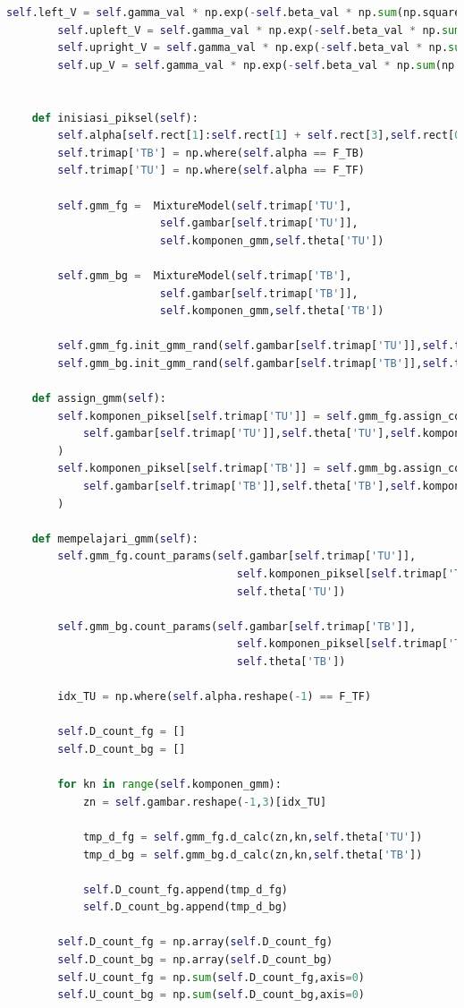 \begin{lstlisting}[language=Python,basicstyle=\tiny]
		self.left_V = self.gamma_val * np.exp(-self.beta_val * np.sum(np.square(left_diff_V),axis=2))
		self.upleft_V = self.gamma_val * np.exp(-self.beta_val * np.sum(np.square(upleft_diff_V),axis=2))
		self.upright_V = self.gamma_val * np.exp(-self.beta_val * np.sum(np.square(upright_diff_V),axis=2))
		self.up_V = self.gamma_val * np.exp(-self.beta_val * np.sum(np.square(up_diff_V),axis=2))


	def inisiasi_piksel(self):
		self.alpha[self.rect[1]:self.rect[1] + self.rect[3],self.rect[0]:self.rect[0] + self.rect[2]] = F_TF
		self.trimap['TB'] = np.where(self.alpha == F_TB)
		self.trimap['TU'] = np.where(self.alpha == F_TF)

		self.gmm_fg =  MixtureModel(self.trimap['TU'],
						self.gambar[self.trimap['TU']],
						self.komponen_gmm,self.theta['TU'])

		self.gmm_bg =  MixtureModel(self.trimap['TB'],
						self.gambar[self.trimap['TB']],
						self.komponen_gmm,self.theta['TB'])

		self.gmm_fg.init_gmm_rand(self.gambar[self.trimap['TU']],self.theta['TU'])
		self.gmm_bg.init_gmm_rand(self.gambar[self.trimap['TB']],self.theta['TB'])

	def assign_gmm(self):
		self.komponen_piksel[self.trimap['TU']] = self.gmm_fg.assign_component(
			self.gambar[self.trimap['TU']],self.theta['TU'],self.komponen_gmm
		)
		self.komponen_piksel[self.trimap['TB']] = self.gmm_bg.assign_component(
			self.gambar[self.trimap['TB']],self.theta['TB'],self.komponen_gmm
		)

	def mempelajari_gmm(self):
		self.gmm_fg.count_params(self.gambar[self.trimap['TU']],
									self.komponen_piksel[self.trimap['TU']],
									self.theta['TU'])

		self.gmm_bg.count_params(self.gambar[self.trimap['TB']],
									self.komponen_piksel[self.trimap['TB']],
									self.theta['TB'])

		idx_TU = np.where(self.alpha.reshape(-1) == F_TF)

		self.D_count_fg = []
		self.D_count_bg = []

		for kn in range(self.komponen_gmm):
			zn = self.gambar.reshape(-1,3)[idx_TU]

			tmp_d_fg = self.gmm_fg.d_calc(zn,kn,self.theta['TU'])
			tmp_d_bg = self.gmm_bg.d_calc(zn,kn,self.theta['TB'])

			self.D_count_fg.append(tmp_d_fg)
			self.D_count_bg.append(tmp_d_bg)

		self.D_count_fg = np.array(self.D_count_fg)
		self.D_count_bg = np.array(self.D_count_bg)
		self.U_count_fg = np.sum(self.D_count_fg,axis=0)
		self.U_count_bg = np.sum(self.D_count_bg,axis=0)


\end{lstlisting}
